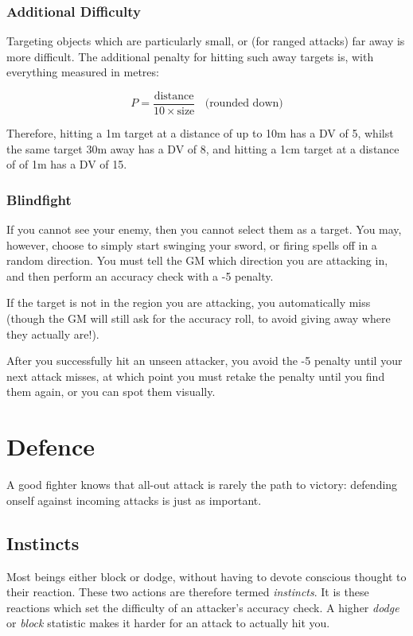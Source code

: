 \subsubsection{Additional Difficulty}

Targeting objects which are particularly small, or (for ranged attacks) far away is more difficult.  The additional penalty for hitting such away targets is, with everything measured in metres:

$$ P = \frac{\text{distance}}{10 \times \text{size}} ~~~~ \text{(rounded down)}$$

Therefore, hitting a 1m target at a distance of up to 10m has a DV of 5, whilst the same target 30m away has a DV of 8, and hitting a 1cm target at a distance of of 1m has a DV of 15. 

\subsubsection{Blindfight}\label{S:Unseen}

If you cannot see your enemy, then you cannot select them as a target. You may, however, choose to simply start swinging your sword, or firing spells off in a random direction. You must tell the GM which direction you are attacking in, and then perform an accuracy check with a -5 penalty. 

If the target is not in the region  you are attacking, you automatically miss (though the GM will still ask for the accuracy roll, to avoid giving away where they actually are!). 

After you successfully hit an unseen attacker, you avoid the -5 penalty until your next attack misses, at which point you must retake the penalty until you find them again, or you can spot them visually. 


\section{Defence}\label{S:Accuracy}

A good fighter knows that all-out attack is rarely the path to victory: defending onself against incoming attacks is just as important. 

\subsection{Instincts} \label{S:AC}

Most beings either block or dodge, without having to devote conscious thought to their reaction. These two actions are therefore termed {\it instincts}. It is these reactions which set the difficulty of an attacker's accuracy check. A higher {\it dodge} or {\it block} statistic makes it harder for an attack to actually hit you. 

